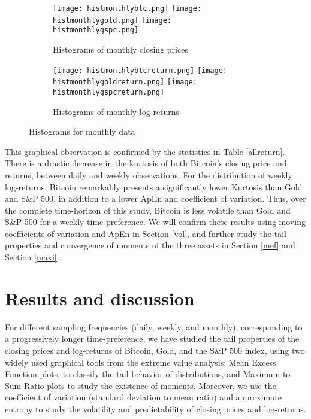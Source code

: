 \documentclass[12pt]{article}
\begin{document}
\begin{figure}[H]
\centering
\begin{subfigure}[b]{\textwidth}
\texttt{[image: histmonthlybtc.png]}\hfill
\texttt{[image: histmonthlygold.png]}\hfill
\texttt{[image: histmonthlygspc.png]}\hfill
\caption{Histograms of monthly closing prices}
\label{histmonthly}
\end{subfigure}
\begin{subfigure}[b]{\textwidth}
\texttt{[image: histmonthlybtcreturn.png]}\hfill
\texttt{[image: histmonthlygoldreturn.png]}\hfill
\texttt{[image: histmonthlygspcreturn.png]}\hfill
\caption{Histograms of monthly log-returns}
\label{histmonthlyreturn}
\end{subfigure}
\caption{\label{histmonthly} Histograms for monthly data}

\end{figure}

This graphical observation is confirmed by the statistics in Table \ref{allreturn}. There is a drastic decrease in the kurtosis of both Bitcoin's closing price and returns, between daily and weekly observations. For the distribution of weekly log-returns, Bitcoin remarkably presents a significantly lower Kurtosis than Gold and S\&P 500, in addition to a lower ApEn and coefficient of variation. Thus, over the complete time-horizon of this study, Bitcoin is less volatile than Gold and S\&P 500 for a weekly time-preference. We will confirm these results using moving coefficients of variation and ApEn in Section \ref{vol}, and further study the tail properties and convergence of moments of the three assets in Section \ref{mef} and Section \ref{maxi}.
 

\section{Results and discussion}
\label{results}
For different sampling frequencies (daily, weekly, and monthly), corresponding to a progressively longer time-preference, we have studied the tail properties of the closing prices and log-returns of Bitcoin, Gold, and the S\&P 500 index, using two widely used graphical tools from the extreme value analysis; Mean Excess Function plots, to classify the tail behavior of distributions, and Maximum to Sum Ratio plots to study the existence of moments. Moreover, we use the coefficient of variation (standard deviation to mean ratio) and approximate entropy to study the volatility and predictability of closing prices and log-returns.
\end{document}
